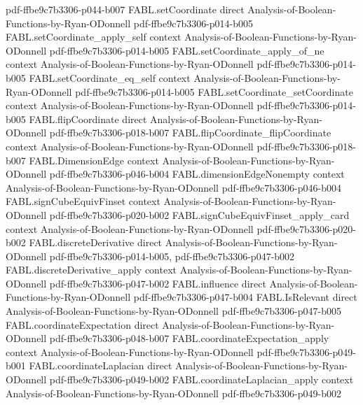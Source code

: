\begin{theorem}
  {pdf-ffbe9c7b3306-p044-b007}
\proofstep
  {FABL.setCoordinate}
  {direct}
  {Analysis-of-Boolean-Functions-by-Ryan-ODonnell}
  {pdf-ffbe9c7b3306-p014-b005}
\proofstep
  {FABL.setCoordinate_apply_self}
  {context}
  {Analysis-of-Boolean-Functions-by-Ryan-ODonnell}
  {pdf-ffbe9c7b3306-p014-b005}
\proofstep
  {FABL.setCoordinate_apply_of_ne}
  {context}
  {Analysis-of-Boolean-Functions-by-Ryan-ODonnell}
  {pdf-ffbe9c7b3306-p014-b005}
\proofstep
  {FABL.setCoordinate_eq_self}
  {context}
  {Analysis-of-Boolean-Functions-by-Ryan-ODonnell}
  {pdf-ffbe9c7b3306-p014-b005}
\proofstep
  {FABL.setCoordinate_setCoordinate}
  {context}
  {Analysis-of-Boolean-Functions-by-Ryan-ODonnell}
  {pdf-ffbe9c7b3306-p014-b005}
\proofstep
  {FABL.flipCoordinate}
  {direct}
  {Analysis-of-Boolean-Functions-by-Ryan-ODonnell}
  {pdf-ffbe9c7b3306-p018-b007}
\proofstep
  {FABL.flipCoordinate_flipCoordinate}
  {context}
  {Analysis-of-Boolean-Functions-by-Ryan-ODonnell}
  {pdf-ffbe9c7b3306-p018-b007}
\proofstep
  {FABL.DimensionEdge}
  {context}
  {Analysis-of-Boolean-Functions-by-Ryan-ODonnell}
  {pdf-ffbe9c7b3306-p046-b004}
\proofstep
  {FABL.dimensionEdgeNonempty}
  {context}
  {Analysis-of-Boolean-Functions-by-Ryan-ODonnell}
  {pdf-ffbe9c7b3306-p046-b004}
\proofstep
  {FABL.signCubeEquivFinset}
  {context}
  {Analysis-of-Boolean-Functions-by-Ryan-ODonnell}
  {pdf-ffbe9c7b3306-p020-b002}
\proofstep
  {FABL.signCubeEquivFinset_apply_card}
  {context}
  {Analysis-of-Boolean-Functions-by-Ryan-ODonnell}
  {pdf-ffbe9c7b3306-p020-b002}
\proofstep
  {FABL.discreteDerivative}
  {direct}
  {Analysis-of-Boolean-Functions-by-Ryan-ODonnell}
  {pdf-ffbe9c7b3306-p014-b005,
    pdf-ffbe9c7b3306-p047-b002}
\proofstep
  {FABL.discreteDerivative_apply}
  {context}
  {Analysis-of-Boolean-Functions-by-Ryan-ODonnell}
  {pdf-ffbe9c7b3306-p047-b002}
\proofstep
  {FABL.influence}
  {direct}
  {Analysis-of-Boolean-Functions-by-Ryan-ODonnell}
  {pdf-ffbe9c7b3306-p047-b004}
\proofstep
  {FABL.IsRelevant}
  {direct}
  {Analysis-of-Boolean-Functions-by-Ryan-ODonnell}
  {pdf-ffbe9c7b3306-p047-b005}
\proofstep
  {FABL.coordinateExpectation}
  {direct}
  {Analysis-of-Boolean-Functions-by-Ryan-ODonnell}
  {pdf-ffbe9c7b3306-p048-b007}
\proofstep
  {FABL.coordinateExpectation_apply}
  {context}
  {Analysis-of-Boolean-Functions-by-Ryan-ODonnell}
  {pdf-ffbe9c7b3306-p049-b001}
\proofstep
  {FABL.coordinateLaplacian}
  {direct}
  {Analysis-of-Boolean-Functions-by-Ryan-ODonnell}
  {pdf-ffbe9c7b3306-p049-b002}
\proofstep
  {FABL.coordinateLaplacian_apply}
  {context}
  {Analysis-of-Boolean-Functions-by-Ryan-ODonnell}
  {pdf-ffbe9c7b3306-p049-b002}

\end{theorem}
